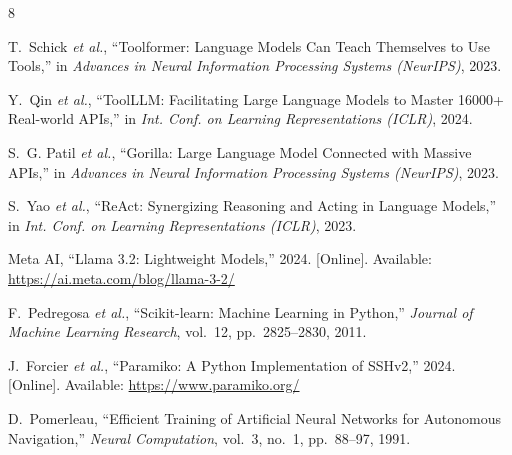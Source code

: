 \documentclass[conference]{IEEEtran}
\begin{document}
\begin{thebibliography}{8}

T.~Schick \emph{et al.}, ``Toolformer: Language Models Can Teach Themselves to
Use Tools,'' in \emph{Advances in Neural Information Processing Systems
(NeurIPS)}, 2023.

Y.~Qin \emph{et al.}, ``ToolLLM: Facilitating Large Language Models to Master
16000+ Real-world APIs,'' in \emph{Int. Conf. on Learning Representations
(ICLR)}, 2024.

S.~G. Patil \emph{et al.}, ``Gorilla: Large Language Model Connected with Massive
APIs,'' in \emph{Advances in Neural Information Processing Systems (NeurIPS)},
2023.

S.~Yao \emph{et al.}, ``ReAct: Synergizing Reasoning and Acting in Language
Models,'' in \emph{Int. Conf. on Learning Representations (ICLR)}, 2023.

Meta AI, ``Llama 3.2: Lightweight Models,'' 2024. [Online]. Available:
\url{https://ai.meta.com/blog/llama-3-2/}

F.~Pedregosa \emph{et al.}, ``Scikit-learn: Machine Learning in Python,''
\emph{Journal of Machine Learning Research}, vol.~12, pp.~2825--2830, 2011.

J.~Forcier \emph{et al.}, ``Paramiko: A Python Implementation of SSHv2,'' 2024.
[Online]. Available: \url{https://www.paramiko.org/}

D.~Pomerleau, ``Efficient Training of Artificial Neural Networks for Autonomous
Navigation,'' \emph{Neural Computation}, vol.~3, no.~1, pp.~88--97, 1991.

\end{thebibliography}
\end{document}
